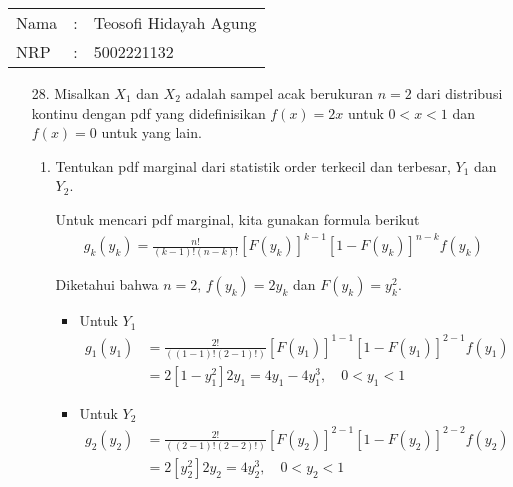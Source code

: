 \documentclass{exam}
\begin{document}
\begin{tabular}{|lcl|}
    \hline
    Nama&:&Teosofi Hidayah Agung\\
    NRP&:&5002221132\\
    \hline
\end{tabular}
    \begin{enumerate}
        \item [28.] Misalkan $X_1$ dan $X_2$ adalah sampel acak berukuran $n=2$ dari distribusi kontinu dengan pdf yang didefinisikan $f(x)=2x$ untuk $0<x<1$ dan $f(x)=0$ untuk yang lain.
        \begin{enumerate}
            \item Tentukan pdf marginal dari statistik order terkecil dan terbesar, $Y_1$ dan $Y_2$.
            \begin{solution}
                Untuk mencari pdf marginal, kita gunakan formula berikut
                \begin{align*}
                    g_k(y_k)=\frac{n!}{(k-1)!(n-k)!}[F(y_k)]^{k-1}[1-F(y_k)]^{n-k}f(y_k)
                \end{align*}

                Diketahui bahwa $n=2,\,f(y_k)=2y_k$ dan $F(y_k)=y_k^2$.
                \begin{itemize}
                    \item Untuk $Y_1$
                    \begin{align*}
                        g_{1}(y_1) &= \frac{2!}{((1-1)!(2-1)!)}[F(y_1)]^{1-1}[1-F(y_1)]^{2-1}f(y_1)\\
                        &= 2[1-y_1^2]2y_1 = 4y_1-4y_1^3,\quad 0<y_1<1
                    \end{align*}
                    \item Untuk $Y_2$
                    \begin{align*}
                        g_{2}(y_2) &= \frac{2!}{((2-1)!(2-2)!)}[F(y_2)]^{2-1}[1-F(y_2)]^{2-2}f(y_2)\\
                        &= 2[y_2^2]2y_2 = 4y_2^3,\quad 0<y_2<1
                    \end{align*}
                \end{itemize}
                

\end{solution}
\end{enumerate}
\end{enumerate}
\end{document}
